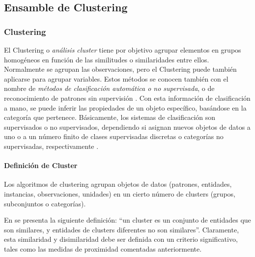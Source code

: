 \subsection{Ensamble de Clustering}
\subsubsection{Clustering}\label{sec:clustering}
El Clustering o \textit{análisis cluster} tiene por objetivo agrupar elementos en grupos homogéneos en función de las similitudes o similaridades entre ellos. Normalmente se agrupan las observaciones, pero el Clustering puede también aplicarse para agrupar variables. Estos métodos se conocen también con el nombre de \textit{métodos de clasificación automática o no supervisada}, o de reconocimiento de patrones sin supervisión \citep{pena2013analisis}. Con esta información de clasificación a mano, se puede inferir las propiedades de un objeto específico, basándose en la categoría que pertenece. Básicamente, los sistemas de clasificación son supervisados o no supervisados, dependiendo si asignan nuevos objetos de datos a uno o a un número finito de clases supervisadas discretas o categorías no supervisadas, respectivamente \citep{xu2008clustering}.

\paragraph{Definición de Cluster}
Los algoritmos de clustering agrupan objetos de datos (patrones, entidades, instancias, observaciones, unidades) en un cierto número de clusters (grupos, subconjuntos o categorías).

\bigskip En \citep{everittcluster} se presenta la siguiente definición: “un cluster es un conjunto de entidades que son similares, y entidades de clusters diferentes no son similares”. Claramente, esta similaridad y disimilaridad debe ser definida con un criterio significativo, tales como las medidas de proximidad comentadas anteriormente.

